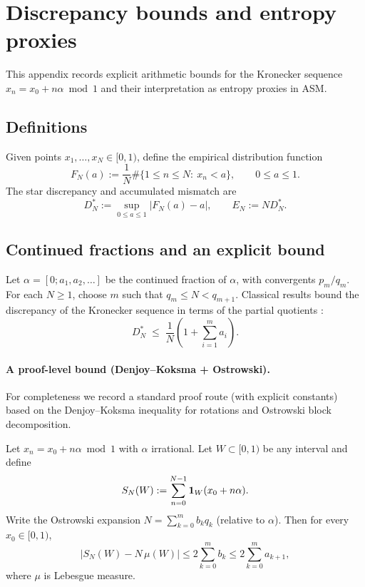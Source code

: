 \section{Discrepancy bounds and entropy proxies}
\label{app:discrepancy_entropy}

This appendix records explicit arithmetic bounds for the Kronecker sequence $x_n=x_0+n\alpha\bmod 1$ and their interpretation as entropy proxies in ASM.

\subsection{Definitions}

Given points $x_1,\dots,x_N\in[0,1)$, define the empirical distribution function
\begin{equation}
F_N(a):=\frac{1}{N}\#\{1\le n\le N:\ x_n<a\},\qquad 0\le a\le 1.
\end{equation}
The star discrepancy and accumulated mismatch are
\begin{equation}
D_N^\ast := \sup_{0\le a\le 1}\left|F_N(a)-a\right|,\qquad
E_N:=N D_N^\ast.
\end{equation}

\subsection{Continued fractions and an explicit bound}

Let $\alpha=[0;a_1,a_2,\dots]$ be the continued fraction of $\alpha$, with convergents $p_m/q_m$. For each $N\ge 1$, choose $m$ such that $q_m\le N<q_{m+1}$. Classical results bound the discrepancy of the Kronecker sequence in terms of the partial quotients \cite{KuipersNiederreiter1974,Cassels1957}:
\begin{equation}
D_N^\ast \;\le\; \frac{1}{N}\left(1+\sum_{i=1}^{m} a_i\right).
\label{eq:explicit_disc_bound}
\end{equation}

\paragraph{A proof-level bound (Denjoy--Koksma + Ostrowski).}
For completeness we record a standard proof route (with explicit constants) based on the Denjoy--Koksma inequality for rotations and Ostrowski block decomposition.

\begin{theorem}
\label{thm:ostrowski_dk_hpt}
Let $x_n=x_0+n\alpha\bmod 1$ with $\alpha$ irrational. Let $W\subset[0,1)$ be any interval and define
\begin{equation}
S_N(W):=\sum_{n=0}^{N-1}\mathbf{1}_W(x_0+n\alpha).
\end{equation}
Write the Ostrowski expansion $N=\sum_{k=0}^m b_k q_k$ (relative to $\alpha$). Then for every $x_0\in[0,1)$,
\begin{equation}
\left|S_N(W)-N\,\mu(W)\right|
\le 2\sum_{k=0}^m b_k
\le 2\sum_{k=0}^m a_{k+1},
\end{equation}
where $\mu$ is Lebesgue measure.
\end{theorem}

